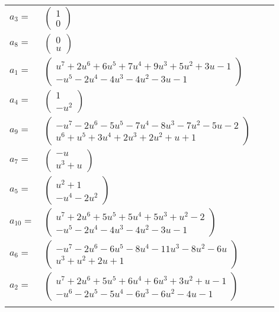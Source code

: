 \documentclass[1p]{elsarticle_modified}
\theoremstyle{definition}
\begin{document}
\begin{tabular}{m{7pt} m{180pt} m{7pt} m{180pt} }
\flushright $a_{3}=$&$\begin{pmatrix}1\\0\end{pmatrix}$ \\
\flushright $a_{8}=$&$\begin{pmatrix}0\\u\end{pmatrix}$ \\
\flushright $a_{1}=$&$\begin{pmatrix}u^7+2 u^6+6 u^5+7 u^4+9 u^3+5 u^2+3 u-1\\- u^5-2 u^4-4 u^3-4 u^2-3 u-1\end{pmatrix}$ \\
\flushright $a_{4}=$&$\begin{pmatrix}1\\- u^2\end{pmatrix}$ \\
\flushright $a_{9}=$&$\begin{pmatrix}- u^7-2 u^6-5 u^5-7 u^4-8 u^3-7 u^2-5 u-2\\u^6+u^5+3 u^4+2 u^3+2 u^2+u+1\end{pmatrix}$ \\
\flushright $a_{7}=$&$\begin{pmatrix}- u\\u^3+u\end{pmatrix}$ \\
\flushright $a_{5}=$&$\begin{pmatrix}u^2+1\\- u^4-2 u^2\end{pmatrix}$ \\
\flushright $a_{10}=$&$\begin{pmatrix}u^7+2 u^6+5 u^5+5 u^4+5 u^3+u^2-2\\- u^5-2 u^4-4 u^3-4 u^2-3 u-1\end{pmatrix}$ \\
\flushright $a_{6}=$&$\begin{pmatrix}- u^7-2 u^6-6 u^5-8 u^4-11 u^3-8 u^2-6 u\\u^3+u^2+2 u+1\end{pmatrix}$ \\
\flushright $a_{2}=$&$\begin{pmatrix}u^7+2 u^6+5 u^5+6 u^4+6 u^3+3 u^2+u-1\\- u^6-2 u^5-5 u^4-6 u^3-6 u^2-4 u-1\end{pmatrix}$\\&\end{tabular}
\end{document}
